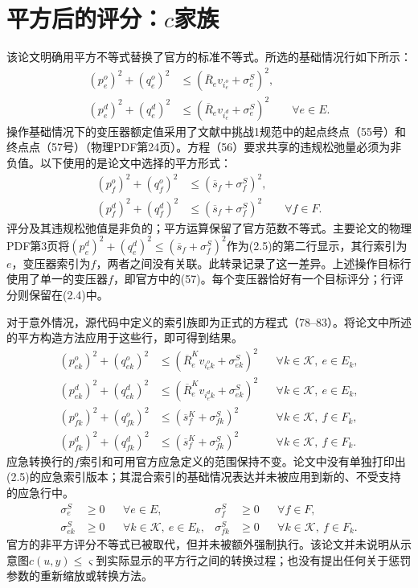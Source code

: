 \documentclass{article}
\begin{document}
\section*{平方后的评分：$c$家族}
该论文明确用平方不等式替换了官方的标准不等式。所选的基础情况行如下所示：
\begin{equation}\tag{2.4}
\begin{aligned}
(p_e^o)^2+(q_e^o)^2&\leq(\overline R_ev_{i_e^o}+\sigma_e^S)^2,\\
(p_e^d)^2+(q_e^d)^2&\leq(\overline R_ev_{i_e^d}+\sigma_e^S)^2
\qquad\forall e\in E.
\end{aligned}
\end{equation}
操作基础情况下的变压器额定值采用了文献中挑战1规范中的起点终点（55号）和终点点（57号）（物理PDF第24页）。方程（56）要求共享的违规松弛量必须为非负值。以下使用的是论文中选择的平方形式：
\begin{equation}\tag{2.5, implemented}
\begin{aligned}
(p_f^o)^2+(q_f^o)^2&\leq(\overline s_f+\sigma_f^S)^2,\\
(p_f^d)^2+(q_f^d)^2&\leq(\overline s_f+\sigma_f^S)^2
\qquad\forall f\in F.
\end{aligned}
\end{equation}
评分及其违规松弛值是非负的；平方运算保留了官方范数不等式。主要论文的物理PDF第3页将$(p_e^d)^2+(q_e^d)^2\leq(\overline s_f+\sigma_f^S)^2$作为(2.5)的第二行显示，其行索引为$e$，变压器索引为$f$，两者之间没有关联。此转录记录了这一差异。上述操作目标行使用了单一的变压器$f$，即官方中的(57)。每个变压器恰好有一个目标评分；行评分则保留在(2.4)中。

对于意外情况，源代码中定义的索引族即为正式的方程式（78–83）。将论文中所述的平方构造方法应用于这些行，即可得到结果。
\begin{align*}
(p_{ek}^o)^2+(q_{ek}^o)^2&\leq(\overline R_e^K v_{i_e^o k}+\sigma_{ek}^S)^2
&&\forall k\in\mathcal K,\ e\in E_k,\\
(p_{ek}^d)^2+(q_{ek}^d)^2&\leq(\overline R_e^K v_{i_e^d k}+\sigma_{ek}^S)^2
&&\forall k\in\mathcal K,\ e\in E_k,\\
(p_{fk}^o)^2+(q_{fk}^o)^2&\leq(\overline s_f^K+\sigma_{fk}^S)^2
&&\forall k\in\mathcal K,\ f\in F_k,\\
(p_{fk}^d)^2+(q_{fk}^d)^2&\leq(\overline s_f^K+\sigma_{fk}^S)^2
&&\forall k\in\mathcal K,\ f\in F_k.
\end{align*}
应急转换行的$f$索引和可用官方应急定义的范围保持不变。论文中没有单独打印出(2.5)的应急索引版本；其混合索引的基础情况表达并未被应用到新的、不受支持的应急行中。
\begin{align*}
\sigma_e^S&\geq0 &&\forall e\in E,&
\sigma_f^S&\geq0 &&\forall f\in F,\\
\sigma_{ek}^S&\geq0 &&\forall k\in\mathcal K,\ e\in E_k,&
\sigma_{fk}^S&\geq0 &&\forall k\in\mathcal K,\ f\in F_k.
\end{align*}
官方的非平方评分不等式已被取代，但并未被额外强制执行。该论文并未说明从示意图$c(u,y)\leq\varsigma$到实际显示的平方行之间的转换过程；也没有提出任何关于惩罚参数的重新缩放或转换方法。
\end{document}
